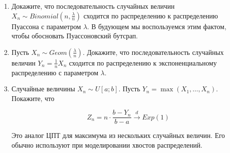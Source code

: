 \documentclass[12pt, a4paper, oneside]{article}
\begin{document}
\begin{problem}{ } 
\vspace{-1.2cm}
\begin{enumerate}
    \item Докажите, что последовательность случайных величин  $X_n \sim Binomial\left(n, \frac{\lambda}{n}\right)$ сходится по распределению к распределению Пуассона с параметром $\lambda$. В будующем мы воспользуемся этим фактом, чтобы обосновать Пуассоновский бутсрап. 
    
    \item Пусть $X_n \sim Geom(\frac{\lambda}{n})$. Докажите, что последовательность случайных величин $Y_n = \frac{1}{n} X_n$ сходится по распределению к экспоненциальному распределению с параметром $\lambda$. 
    
    \item Случайные величины $X_n \sim U[a;b]$. Пусть $Y_n = \max(X_1, \ldots, X_n)$. Покажите, что 
		
    $$
    Z_n = n \cdot \frac{b - Y_n}{b - a} \overset{d}{\to}  Exp(1)
    $$  
    
    Это аналог ЦПТ для максимума из нескольких случайных величин. Его обычно используют при моделировании хвостов распределений.
\end{enumerate}
\end{problem} 




\end{document}
